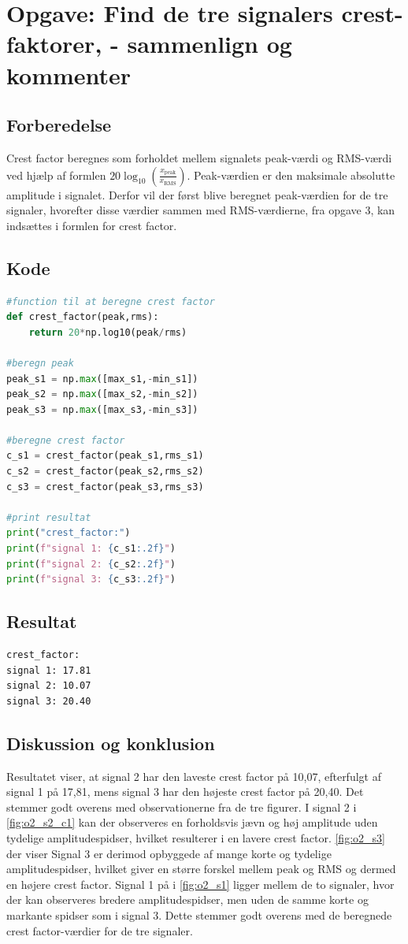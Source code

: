 \documentclass[11pt,a4paper]{report}
\begin{document}
\newpage
\section{Opgave: Find de tre signalers crest-faktorer, - sammenlign og kommenter}

\subsection{Forberedelse}
Crest factor beregnes som forholdet mellem signalets peak-værdi og RMS-værdi ved hjælp af formlen $20 \log_{10}\left(\frac{x_{\text{peak}}}{x_{\text{RMS}}}\right)$. Peak-værdien er den maksimale absolutte amplitude i signalet. Derfor vil der først blive beregnet peak-værdien for de tre signaler, hvorefter disse værdier sammen med RMS-værdierne, fra opgave 3, kan indsættes i formlen for crest factor.

\subsection{Kode}
\begin{lstlisting}[language=Python]
#function til at beregne crest factor
def crest_factor(peak,rms):
    return 20*np.log10(peak/rms)

#beregn peak
peak_s1 = np.max([max_s1,-min_s1])
peak_s2 = np.max([max_s2,-min_s2])
peak_s3 = np.max([max_s3,-min_s3])

#beregne crest factor
c_s1 = crest_factor(peak_s1,rms_s1)
c_s2 = crest_factor(peak_s2,rms_s2)
c_s3 = crest_factor(peak_s3,rms_s3)

#print resultat
print("crest_factor:")
print(f"signal 1: {c_s1:.2f}")
print(f"signal 2: {c_s2:.2f}")
print(f"signal 3: {c_s3:.2f}")
\end{lstlisting}

\subsection{Resultat}
\begin{lstlisting}[language=Bash]
crest_factor:
signal 1: 17.81
signal 2: 10.07
signal 3: 20.40
\end{lstlisting}

\subsection{Diskussion og konklusion}
Resultatet viser, at signal 2 har den laveste crest factor på 10,07, efterfulgt af signal 1 på 17,81, mens signal 3 har den højeste crest factor på 20,40. Det stemmer godt overens med observationerne fra de tre figurer. I signal 2 i \autoref{fig:o2_s2_c1} kan der observeres en forholdsvis jævn og høj amplitude uden tydelige amplitudespidser, hvilket resulterer i en lavere crest factor. \autoref{fig:o2_s3} der viser Signal 3 er derimod opbyggede af mange korte og tydelige amplitudespidser, hvilket giver en større forskel mellem peak og RMS og dermed en højere crest factor. Signal 1 på i \autoref{fig:o2_s1} ligger mellem de to signaler, hvor der kan observeres bredere amplitudespidser, men uden de samme korte og markante spidser som i signal 3. Dette stemmer godt overens med de beregnede crest factor-værdier for de tre signaler.
\end{document}
